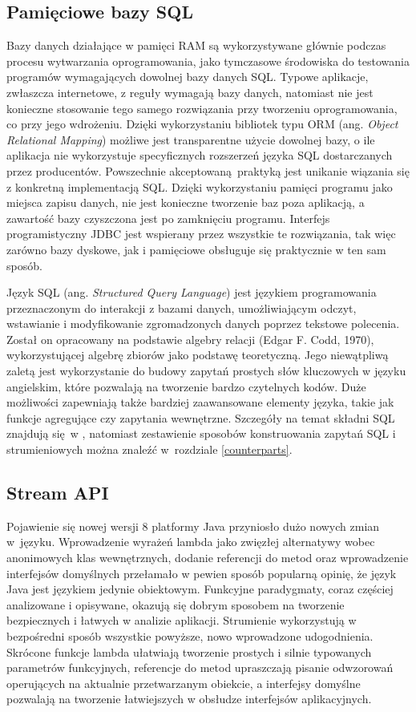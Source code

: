 \documentclass[12pt,twoside,openright]{extarticle}
\begin{document}
\subsection{Pamięciowe bazy SQL}


      Bazy danych działające w pamięci RAM są wykorzystywane głównie podczas procesu wytwarzania oprogramowania, jako tymczasowe środowiska do testowania programów wymagających dowolnej bazy danych SQL. Typowe aplikacje, zwłaszcza internetowe, z reguły wymagają bazy danych, natomiast nie jest konieczne stosowanie tego samego rozwiązania przy tworzeniu oprogramowania, co przy jego wdrożeniu. Dzięki wykorzystaniu bibliotek typu ORM \cite{orm} (ang. \textit{Object Relational Mapping}) możliwe jest transparentne użycie dowolnej bazy, o ile aplikacja nie wykorzystuje specyficznych rozszerzeń języka SQL dostarczanych przez producentów. Powszechnie akceptowaną praktyką jest unikanie wiązania się z konkretną implementacją SQL. Dzięki wykorzystaniu pamięci programu jako miejsca zapisu danych, nie jest konieczne tworzenie baz poza aplikacją, a zawartość bazy czyszczona jest po zamknięciu programu. Interfejs programistyczny JDBC \cite{jdbc} jest wspierany przez wszystkie te rozwiązania, tak więc zarówno bazy dyskowe, jak i pamięciowe obsługuje się praktycznie w ten sam sposób. 

      Język SQL (ang. \textit{Structured Query Language}) jest językiem programowania przeznaczonym do interakcji z bazami danych, umożliwiającym odczyt, wstawianie i modyfikowanie zgromadzonych danych poprzez tekstowe polecenia. Został on opracowany na podstawie algebry relacji (Edgar F. Codd, 1970), wykorzystującej algebrę zbiorów jako podstawę teoretyczną. Jego niewątpliwą zaletą jest wykorzystanie do budowy zapytań prostych słów kluczowych w języku angielskim, które pozwalają na tworzenie bardzo czytelnych kodów. Duże możliwości zapewniają także bardziej zaawansowane elementy języka, takie jak funkcje agregujące czy zapytania wewnętrzne. Szczegóły na temat składni SQL znajdują się w \cite{ullman}, natomiast zestawienie sposobów konstruowania zapytań SQL i strumieniowych można znaleźć w~rozdziale \ref{counterparts}.


\subsection{Stream API}

    Pojawienie się nowej wersji 8 platformy Java przyniosło dużo nowych zmian w~języku. Wprowadzenie wyrażeń lambda jako zwięzłej alternatywy wobec anonimowych klas wewnętrznych, dodanie referencji do metod oraz wprowadzenie interfejsów domyślnych przełamało w pewien sposób popularną opinię, że język Java jest językiem jedynie obiektowym. Funkcyjne paradygmaty, coraz częściej analizowane i opisywane, okazują się dobrym sposobem na tworzenie bezpiecznych i łatwych w analizie aplikacji. Strumienie wykorzystują w bezpośredni sposób wszystkie powyższe, nowo wprowadzone udogodnienia. Skrócone funkcje lambda ułatwiają tworzenie prostych i silnie typowanych parametrów funkcyjnych, referencje do metod upraszczają pisanie odwzorowań operujących na aktualnie przetwarzanym obiekcie, a interfejsy domyślne pozwalają na tworzenie łatwiejszych w obsłudze interfejsów aplikacyjnych.
\end{document}
